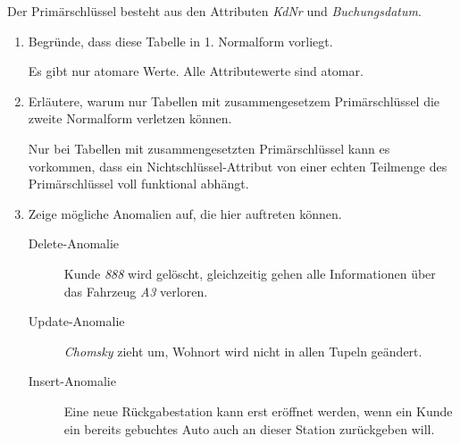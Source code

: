 \documentclass{bschlangaul-aufgabe}
\begin{document}
\bigskip


\bigskip

\noindent
Der Primärschlüssel besteht aus den Attributen \emph{KdNr} und
\emph{Buchungsdatum}.

\begin{enumerate}


\item Begründe, dass diese Tabelle in 1. Normalform vorliegt.

\begin{bAntwort}
Es gibt nur atomare Werte. Alle Attributewerte sind atomar.
\end{bAntwort}


\item Erläutere, warum nur Tabellen mit zusammengesetzem Primärschlüssel
die zweite Normalform verletzen können.

\begin{bAntwort}
Nur bei Tabellen mit zusammengesetzten Primärschlüssel kann es
vorkommen, dass ein Nichtschlüssel-Attribut von einer echten Teilmenge
des Primärschlüssel voll funktional abhängt.
\end{bAntwort}


\item Zeige mögliche Anomalien auf, die hier auftreten können.

\begin{bAntwort}
\begin{description}
\item[Delete-Anomalie]

\zB Kunde \emph{888} wird gelöscht, gleichzeitig gehen alle
Informationen über das Fahrzeug \emph{A3} verloren.

\item[Update-Anomalie]

\zB \emph{Chomsky} zieht um, Wohnort wird nicht in allen Tupeln geändert.

\item[Insert-Anomalie]

\zB Eine neue Rückgabestation kann erst eröffnet werden, wenn ein
Kunde ein bereits gebuchtes Auto auch an dieser Station zurückgeben
will.
\end{description}
\end{bAntwort}


\end{enumerate}
\end{document}
